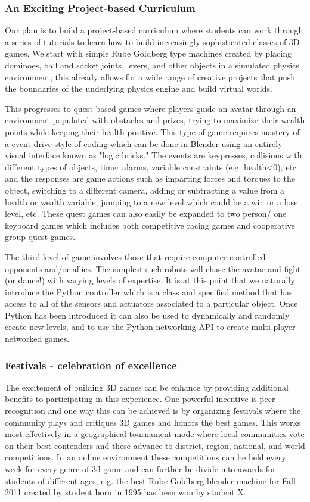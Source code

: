 \documentclass{sig-alternate}
\begin{document}
\subsubsection{An Exciting Project-based Curriculum}
Our plan is to build a project-based curriculum where students can work through a series of tutorials to learn how to build increasingly sophisticated classes of 3D games. We start with simple Rube Goldberg type machines created by placing dominoes, ball and socket joints, levers, and other objects in a simulated physics environment; this already allows for a wide range of creative projects that push the
boundaries of the underlying physics engine and build virtual worlds. 

This progresses to quest based games where players guide an avatar through an environment populated with obstacles and prizes, trying to maximize their wealth points while keeping their health positive. This type of game requires mastery of a event-drive style of coding which can be done in Blender using an entirely  visual interface known as "logic bricks." The events are keypresses, collisions with different types of objects, timer alarms, variable constraints (e.g. health<0),  etc and the responses are game actions such as imparting forces and torques to the object, switching to a different camera, adding or subtracting a value from a health or wealth variable, jumping to a new level which could be a win or a lose level, etc.
These quest games can also easily be expanded to two person/ one keyboard games which includes both competitive racing games and cooperative group quest games.

The third level of game involves those that require computer-controlled opponents and/or allies. The simplest such robots will chase the avatar and fight (or dance!) with varying levels of expertise. It is at this point that we naturally introduce the Python controller which is a class and specified method that has access to all of the sensors and actuators associated to a particular object.  Once Python has been 
introduced it can also be used to dynamically and randomly create new levels, and to use the
Python networking API to create multi-player networked games.

\subsubsection{Festivals - celebration of excellence}
The excitement of building 3D games can be enhance by providing additional benefits to participating
in this experience. One powerful incentive is peer recognition and one way this can be achieved is by
organizing festivals where the community plays and critiques 3D games and honors the best games. This works most effectively in a geographical tournament mode where local communities vote on their best contenders and these advance to district, region, national, and world competitions.  In an online environment these competitions can be held every week for every genre of 3d game and can further be
divide into awards for students of different ages, e.g. the best Rube Goldberg blender machine for Fall 2011 created by student born in 1995 has been won by student X.
\end{document}

